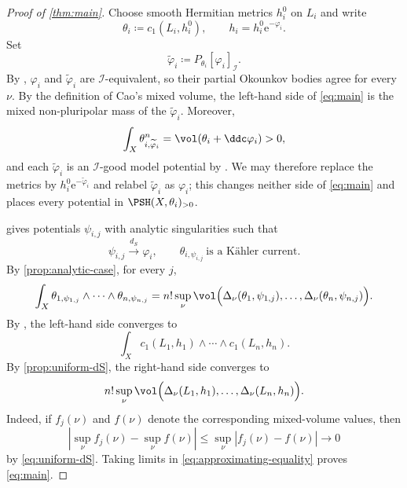 \documentclass[11pt,a4paper]{amsart}
\newcommand{\dS}{d_{S}}
\begin{document}
\begin{proof}[Proof of \cref{thm:main}]
Choose smooth Hermitian metrics $h_i^0$ on $L_i$ and write
\[
 \theta_i\coloneqq c_1\left(L_i,h_i^0\right),\qquad
 h_i=h_i^0\mathrm e^{-\varphi_i}.
\]
Set
\[
 \widetilde\varphi_i\coloneqq
 P_{\theta_i}[\varphi_i]_{\mathcal I}.
\]
By \cite[Proposition~3.2.6]{Xiabook}, $\varphi_i$ and
$\widetilde\varphi_i$ are $\mathcal I$-equivalent, so their partial
Okounkov bodies agree for every $\nu$.  By the definition of Cao's mixed
volume, the left-hand side of \eqref{eq:main} is the mixed non-pluripolar
mass of the $\widetilde\varphi_i$.  Moreover,
\[
 \int_X\theta_{i,\widetilde\varphi_i}^n
 =\vol(\theta_i+\ddc\varphi_i)>0,
\]
and each $\widetilde\varphi_i$ is an $\mathcal I$-good model potential by
\cite[Example~7.1.2]{Xiabook}.  We may therefore replace the metrics by
$h_i^0\mathrm e^{-\widetilde\varphi_i}$ and relabel
$\widetilde\varphi_i$ as $\varphi_i$; this changes neither side of
\eqref{eq:main} and places every potential in
$\PSH(X,\theta_i)_{>0}$.

\Cite[Theorem~7.1.1]{Xiabook} gives potentials $\psi_{i,j}$ with analytic singularities such that
\[
 \psi_{i,j}\xrightarrow{\dS}\varphi_i,
 \qquad \theta_{i,\psi_{i,j}}\ \text{is a K\"ahler current}.
\]
By \cref{prop:analytic-case}, for every $j$,
\begin{equation}\label{eq:approximating-equality}
 \int_X\theta_{1,\psi_{1,j}}\wedge\cdots\wedge\theta_{n,\psi_{n,j}}=n!\sup_\nu\vol\Bigl(
  \Delta_\nu(\theta_1,\psi_{1,j}),\ldots,
  \Delta_\nu(\theta_n,\psi_{n,j})\Bigr).
\end{equation}
By \cite[Theorem~6.2.1]{Xiabook}, the left-hand side converges to
\[
 \int_Xc_1(L_1,h_1)\wedge\cdots\wedge c_1(L_n,h_n).
\]
By \cref{prop:uniform-dS}, the right-hand side converges to
\[
 n!\sup_\nu\vol\Bigl(\Delta_\nu(L_1,h_1),\ldots,\Delta_\nu(L_n,h_n)\Bigr).
\]
Indeed, if $f_j(\nu)$ and $f(\nu)$ denote the corresponding mixed-volume
values, then
\[
 \left|\sup_\nu f_j(\nu)-\sup_\nu f(\nu)\right|
 \leq\sup_\nu|f_j(\nu)-f(\nu)|\longrightarrow0
\]
by \cref{eq:uniform-dS}.
Taking limits in \eqref{eq:approximating-equality} proves \eqref{eq:main}.
\end{proof}
\end{document}

